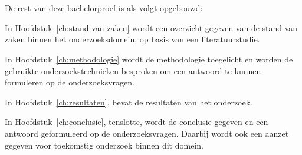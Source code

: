 \section{}%
\label{sec:opzet-bachelorproef}


De rest van deze bachelorproef is als volgt opgebouwd:

In Hoofdstuk~\ref{ch:stand-van-zaken} wordt een overzicht gegeven van de stand van zaken binnen het onderzoeksdomein, op basis van een literatuurstudie.

In Hoofdstuk~\ref{ch:methodologie} wordt de methodologie toegelicht en worden de gebruikte onderzoekstechnieken besproken om een antwoord te kunnen formuleren op de onderzoeksvragen.

In Hoofdstuk~\ref{ch:resultaten}, bevat de resultaten van het onderzoek.

In Hoofdstuk~\ref{ch:conclusie}, tenslotte, wordt de conclusie gegeven en een antwoord geformuleerd op de onderzoeksvragen. Daarbij wordt ook een aanzet gegeven voor toekomstig onderzoek binnen dit domein.